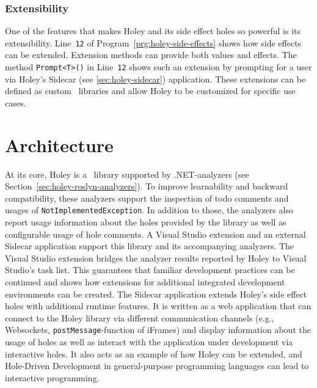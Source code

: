 \subsubsection{Extensibility}
One of the features that makes Holey and its side effect holes so powerful is its extensibility.
Line~\verb|12| of Program~\ref{prg:holey-side-effects} shows how side effects can be extended.
Extension methods can provide both values and effects.
The method \verb|Prompt<T>()| in Line~\verb|12| shows such an extension by prompting for a user via Holey's Sidecar (see \ref{sec:holey-sidecar}) application.
These extensions can be defined as custom \CS\ libraries and allow Holey to be customized for specific use cases.


\section{Architecture}
\label{sec:holey-architecture}
At its core, Holey is a \CS\ library supported by .NET-analyzers (see Section~\ref{sec:holey-roslyn-analyzers}).
To improve learnability and backward compatibility, these analyzers support the inspection of todo comments and usages of \verb|NotImplementedException|.
In addition to those, the analyzers also report usage information about the holes provided by the library as well as configurable usage of hole comments.
A Visual Studio extension and an external Sidecar application support this library and its accompanying analyzers.
The Visual Studio extension bridges the analyzer results reported by Holey to Visual Studio's task list.
This guarantees that familiar development practices can be continued and shows how extensions for additional integrated development environments can be created.
The Sidecar application extends Holey's side effect holes with additional runtime features.
It is written as a web application that can connect to the Holey library via different communication channels (e.g., Websockets, \verb|postMessage|-function of iFrames) and display information about the usage of holes as well as interact with the application under development via interactive holes.
It also acts as an example of how Holey can be extended, and Hole-Driven Development in general-purpose programming languages can lead to interactive programming.

